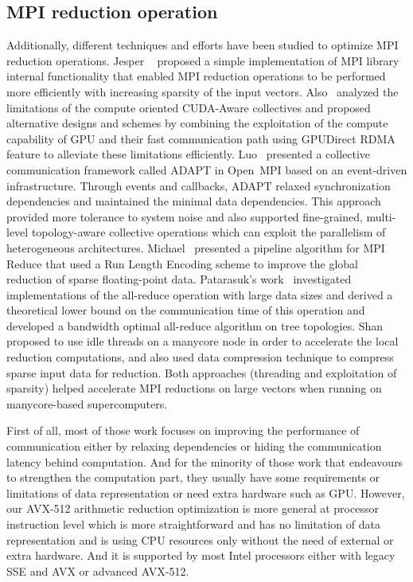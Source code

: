 \documentclass[sigconf]{acmart}
\newcommand{\ompi}[0]{Open~MPI\xspace}
\newcommand{\mpi}[0]{\textsc{MPI}\xspace}
\begin{document}
\subsection{\mpi reduction operation}
Additionally, different techniques and
efforts have been studied to optimize \mpi reduction operations. Jesper
~\cite{Neutral_MPI_Reduction} proposed a simple implementation of MPI library
internal functionality that enabled MPI reduction operations to be performed
more efficiently with increasing sparsity of the input vectors.
%
Also~\cite{gpu-reduce} analyzed the limitations of the compute oriented CUDA-Aware
collectives and proposed alternative designs and schemes by combining the exploitation of the
compute capability of GPU and their fast communication
path using GPUDirect RDMA feature to alleviate these limitations efficiently.
%
Luo~\cite{Luo-adapt} presented a collective communication framework called ADAPT
in \ompi based on an event-driven infrastructure. Through events and callbacks,
ADAPT relaxed synchronization dependencies and maintained the minimal data dependencies.
This approach provided more tolerance to system noise and also supported fine-grained,
multi-level topology-aware collective operations which can exploit the
parallelism of heterogeneous architectures.
%
Michael~\cite{sparse-reduction} presented a pipeline algorithm for MPI Reduce
that used a Run Length Encoding scheme to improve the global reduction of sparse
floating-point data.
Patarasuk's work~\cite{all-reduce09} investigated implementations of the all-reduce operation
with large data sizes and derived a theoretical lower bound on the communication time of this operation and developed
a bandwidth optimal all-reduce algorithm on tree topologies.
%
Shan~\cite{shan-reduce} proposed to use idle threads on a manycore node in order to accelerate
the local reduction computations, and also used data compression technique to compress sparse input data for reduction.
Both approaches (threading and exploitation
of sparsity) helped accelerate MPI reductions on large vectors when
running on manycore-based supercomputers.
%

First of all, most of those work focuses on improving the performance of
communication either by relaxing dependencies or hiding the communication latency behind computation.
And for the minority of those work that endeavours to strengthen the computation part,
they usually have some requirements or limitations of data
representation or need extra hardware such as GPU.
However, our AVX-512 arithmetic reduction
optimization is more general at processor instruction level which is more
straightforward and has no limitation of data representation and is using CPU resources only
without the need of external or extra hardware.
And it is supported by most Intel processors either with legacy SSE and AVX or advanced AVX-512.
\end{document}
